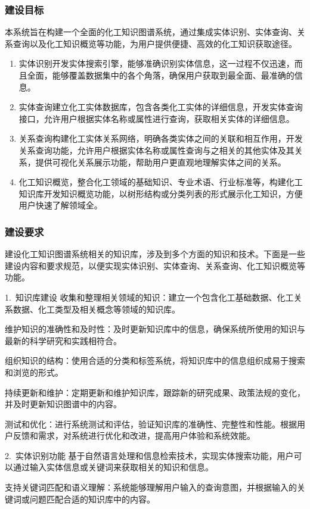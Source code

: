 \subsubsection{建设目标} 
本系统旨在构建一个全面的化工知识图谱系统，通过集成实体识别、实体查询、关系查询以及化工知识概览等功能，为用户提供便捷、高效的化工知识获取途径。
\begin{enumerate}
	\item 实体识别开发实体搜索引擎，能够准确识别实体信息，这一过程不仅迅速，而且全面，能够覆盖数据集中的各个角落，确保用户获取到最全面、最准确的信息。
	\item 实体查询建立化工实体数据库，包含各类化工实体的详细信息，开发实体查询接口，允许用户根据实体名称或属性进行查询，获取相关实体的详细信息。
	\item 关系查询构建化工实体关系网络，明确各类实体之间的关联和相互作用，开发关系查询功能，允许用户根据实体名称或属性查询与之相关的其他实体及其关系，提供可视化关系展示功能，帮助用户更直观地理解实体之间的关系。
	\item 化工知识概览，整合化工领域的基础知识、专业术语、行业标准等，构建化工知识库开发知识概览功能，以树形结构或分类列表的形式展示化工知识，方便用户快速了解领域全。
\end{enumerate}

\subsubsection{建设要求} 
建设化工知识图谱系统相关的知识库，涉及到多个方面的知识和技术。下面是一些建设内容和要求规范，以便实现实体识别、实体查询、关系查询、化工知识概览等功能。 

1.~{知识库建设} 
  收集和整理相关领域的知识：建立一个包含化工基础数据、化工关系数据、化工类型及相关概念等领域的知识库。

维护知识的准确性和及时性：及时更新知识库中的信息，确保系统所使用的知识与最新的科学研究和实践相符合。

组织知识的结构：使用合适的分类和标签系统，将知识库中的信息组织成易于搜索和浏览的形式。

持续更新和维护：定期更新和维护知识库，跟踪新的研究成果、政策法规的变化，并及时更新知识图谱中的内容。

测试和优化：进行系统测试和评估，验证知识库的准确性、完整性和性能。根据用户反馈和需求，对系统进行优化和改进，提高用户体验和系统效能。

2.~{实体识别功能} 
基于自然语言处理和信息检索技术，实现实体搜索功能，用户可以通过输入实体信息或关键词来获取相关的知识和信息。

支持关键词匹配和语义理解：系统能够理解用户输入的查询意图，并根据输入的关键词或问题匹配合适的知识库中的内容。

